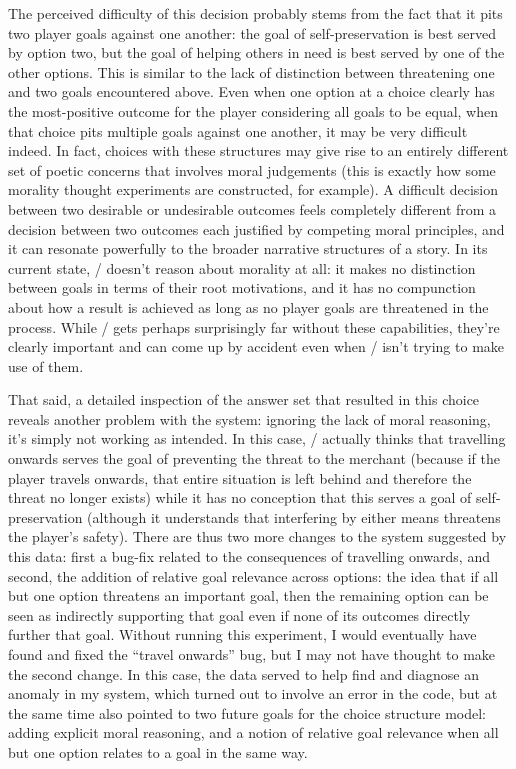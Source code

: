 The perceived difficulty of this decision probably stems from the fact that it pits two player goals against one another: the goal of self-preservation is best served by option two, but the goal of helping others in need is best served by one of the other options.
%
This is similar to the lack of distinction between threatening one and two goals encountered above.
%
Even when one option at a choice clearly has the most-positive outcome for the player considering all goals to be equal, when that choice pits multiple goals against one another, it may be very difficult indeed.
%
In fact, choices with these structures may give rise to an entirely different set of poetic concerns that involves moral judgements (this is exactly how some morality thought experiments are constructed, for example).
%
A difficult decision between two desirable or undesirable outcomes feels completely different from a decision between two outcomes each justified by competing moral principles, and it can resonate powerfully to the broader narrative structures of a story.
%
In its current state, \dunyazad/ doesn't reason about morality at all: it makes no distinction between goals in terms of their root motivations, and it has no compunction about how a result is achieved as long as no player goals are threatened in the process.
%
While \dunyazad/ gets perhaps surprisingly far without these capabilities, they're clearly important and can come up by accident even when \dunyazad/ isn't trying to make use of them.


That said, a detailed inspection of the answer set that resulted in this choice reveals another problem with the system: ignoring the lack of moral reasoning, it's simply not working as intended.
%
In this case, \dunyazad/ actually thinks that travelling onwards serves the goal of preventing the threat to the merchant (because if the player travels onwards, that entire situation is left behind and therefore the threat no longer exists) while it has no conception that this serves a goal of self-preservation (although it understands that interfering by either means threatens the player's safety).
%
There are thus two more changes to the system suggested by this data: first a bug-fix related to the consequences of travelling onwards, and second, the addition of relative goal relevance across options: the idea that if all but one option threatens an important goal, then the remaining option can be seen as indirectly supporting that goal even if none of its outcomes directly further that goal.
%
Without running this experiment, I would eventually have found and fixed the ``travel onwards'' bug, but I may not have thought to make the second change.
%
In this case, the data served to help find and diagnose an anomaly in my system, which turned out to involve an error in the code, but at the same time also pointed to two future goals for the choice structure model: adding explicit moral reasoning, and a notion of relative goal relevance when all but one option relates to a goal in the same way.


